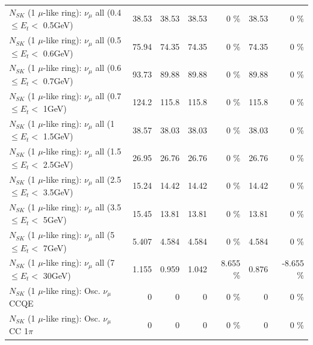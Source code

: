 \begin{table}
\begin{tabular}{| l | r | r | r  r | r  r |}
       $N_{SK}$ (1 $\mu$-like ring): $\nu_{\mu}$ all (0.4 $\leq E_{t} <$ 0.5GeV) &           38.53 &           38.53 &           38.53 &        0 \%  &           38.53 &        0 \%  \\ 
       $N_{SK}$ (1 $\mu$-like ring): $\nu_{\mu}$ all (0.5 $\leq E_{t} <$ 0.6GeV) &           75.94 &           74.35 &           74.35 &        0 \%  &           74.35 &        0 \%  \\ 
       $N_{SK}$ (1 $\mu$-like ring): $\nu_{\mu}$ all (0.6 $\leq E_{t} <$ 0.7GeV) &           93.73 &           89.88 &           89.88 &        0 \%  &           89.88 &        0 \%  \\ 
         $N_{SK}$ (1 $\mu$-like ring): $\nu_{\mu}$ all (0.7 $\leq E_{t} <$ 1GeV) &           124.2 &           115.8 &           115.8 &        0 \%  &           115.8 &        0 \%  \\ 
         $N_{SK}$ (1 $\mu$-like ring): $\nu_{\mu}$ all (1 $\leq E_{t} <$ 1.5GeV) &           38.57 &           38.03 &           38.03 &        0 \%  &           38.03 &        0 \%  \\ 
       $N_{SK}$ (1 $\mu$-like ring): $\nu_{\mu}$ all (1.5 $\leq E_{t} <$ 2.5GeV) &           26.95 &           26.76 &           26.76 &        0 \%  &           26.76 &        0 \%  \\ 
       $N_{SK}$ (1 $\mu$-like ring): $\nu_{\mu}$ all (2.5 $\leq E_{t} <$ 3.5GeV) &           15.24 &           14.42 &           14.42 &        0 \%  &           14.42 &        0 \%  \\ 
         $N_{SK}$ (1 $\mu$-like ring): $\nu_{\mu}$ all (3.5 $\leq E_{t} <$ 5GeV) &           15.45 &           13.81 &           13.81 &        0 \%  &           13.81 &        0 \%  \\ 
           $N_{SK}$ (1 $\mu$-like ring): $\nu_{\mu}$ all (5 $\leq E_{t} <$ 7GeV) &           5.407 &           4.584 &           4.584 &        0 \%  &           4.584 &        0 \%  \\ 
          $N_{SK}$ (1 $\mu$-like ring): $\nu_{\mu}$ all (7 $\leq E_{t} <$ 30GeV) &           1.155 &           0.959 &           1.042 &    8.655 \%  &           0.876 &   -8.655 \%  \\ 
\hline
\hline
                               $N_{SK}$ (1 $\mu$-like ring): Osc. $\nu_\mu$ CCQE &               0 &               0 &               0 &        0 \%  &               0 &        0 \%  \\ 
                          $N_{SK}$ (1 $\mu$-like ring): Osc. $\nu_\mu$ CC 1$\pi$ &               0 &               0 &               0 &        0 \%  &               0 &        0 \%  \\ 

\end{tabular}
\end{table}
